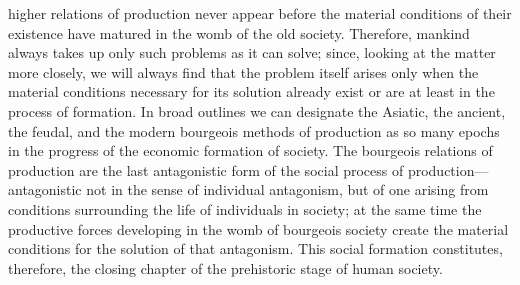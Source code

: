 higher relations of production never appear before the material
conditions of their existence have matured in the womb of the old
society. Therefore, mankind always takes up only such problems as it
can solve; since, looking at the matter more closely, we will always
 find that the problem itself arises only when the material
conditions necessary for its solution already exist or are at least in
the process of formation. In broad outlines we can designate the
Asiatic, the ancient, the feudal, and the modern bourgeois methods of
production as so many epochs in the progress of the economic formation
of society. The bourgeois relations of production are the last
antagonistic form of the social process of production---antagonistic
not in the sense of individual antagonism, but of one arising from
conditions surrounding the life of individuals in society; at the same
time the productive forces developing in the womb of bourgeois society
create the material conditions for the solution of that antagonism.
This social formation constitutes, therefore, the closing chapter of
the prehistoric stage of human society.

